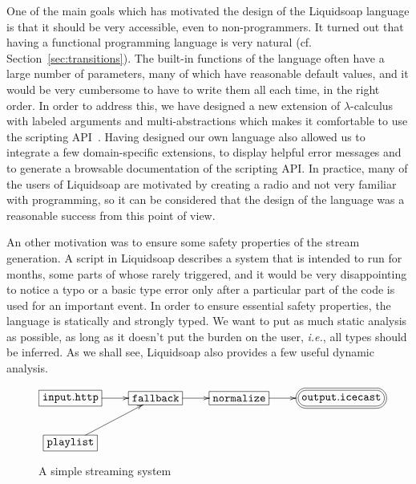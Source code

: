 \documentclass{llncs}
\newcommand{\liquidsoap}{Liquidsoap}
\newcommand{\ie}{\emph{i.e.},}
\newcommand{\cf}{{cf.~}}
\newcommand{\fcaption}[1]{\vspace{-3ex}\caption{#1}\vspace{-4ex}}
\begin{document}
One of the main goals which has motivated the design of the \liquidsoap{}
language is that it should be very accessible, even to non-programmers. It
turned out that having a functional programming language is very natural (\cf
Section~\ref{sec:transitions}). The built-in functions of the language often
have a large number of parameters, many of which have reasonable default 
values, and  it would be very cumbersome to have to write them all each time,
in the right order.
In order to address this, we have designed a new extension of
$\lambda$-calculus with labeled arguments and multi-abstractions which makes it
comfortable to use the scripting
API~\cite{baelde-mimram:webradio-lambda}. Having designed our own language also
allowed us to integrate a few domain-specific extensions, to display helpful
error messages and to generate a browsable documentation of the scripting API. In
practice, many of the users of \liquidsoap{} are motivated by creating a radio
and not very familiar with programming, so it can be considered that the design of
the language was a reasonable success from this point of view.

An other motivation was to ensure some safety properties of the stream
generation. A script in \liquidsoap{} describes a system that is intended to run
for months, some parts of whose rarely triggered, and it would be very
disappointing to notice a typo or a basic type error only after a particular
part of the code is used for an important event. In order to ensure essential
safety properties, the language is statically and strongly typed.
We want to put as
much static analysis as possible, as long as it doesn't put the burden on the
user, \ie{} all types should be inferred. As we shall see, \liquidsoap{} also
provides a few useful dynamic analysis.

\begin{figure}[t]
 \begin{center}
\[
\xymatrix{
  *+[F]{\mathtt{input.http}}\ar[r]&*+[F]{\mathtt{fallback}}\ar[r]&
  *+[F]{\mathtt{normalize}}\ar[r]&
  *+<10pt>[F=:<30pt>]{\mathtt{output.icecast}}\\
  *+[F]{\mathtt{playlist}}\ar[ur]&\\
}
\]
\end{center}
 \fcaption{A simple streaming system}
 \label{fig:simple}
\end{figure}
\end{document}
